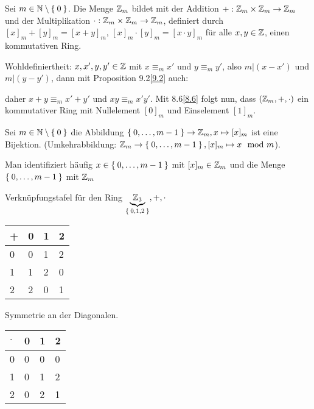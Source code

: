 \documentclass{../../meta/tudscript}
\begin{document}
            Sei $m \in \mathbb{N} \setminus \Set{0}$. Die Menge $\mathbb{Z}_m$ bildet mit der Addition $+: \mathbb{Z}_m \times \mathbb{Z}_m \rightarrow \mathbb{Z}_m$ und der Multiplikation 
            $\cdot: \mathbb{Z}_m \times \mathbb{Z}_m \rightarrow \mathbb{Z}_m$, definiert durch $[x]_m + [y]_m = [x+y]_m$, $[x]_m \cdot [y]_m = [x \cdot y]_m$ für alle $x,y \in \mathbb{Z}$, 
            einen kommutativen Ring.

                Wohldefiniertheit: $x, x', y, y' \in \mathbb{Z}$ mit $x \equiv_m x'$ und $y \equiv_m y'$, also $m|(x-x')$ und $m|(y-y')$, dann mit Proposition 9.2\ref{9.2} auch:
    
                
                daher $x+y \equiv_m  x'+y'$ und $xy \equiv_m x'y'$.
                Mit 8.6\ref{8.6} folgt nun, dass $(\mathbb{Z}_m, +, \cdot)$ ein kommutativer Ring mit Nullelement $[0]_m$ und Einselement $[1]_m$.

            Sei $m \in \mathbb{N} \setminus \Set{0}$ die Abbildung $\Set{0, \ldots, m-1} \rightarrow \mathbb{Z}_m, x \mapsto [x]_m$ ist eine Bijektion. 
            (Umkehrabbildung: $\mathbb{Z}_m \rightarrow \Set{0, \ldots, m-1}, [x]_m \mapsto x \mod m$).

            Man identifiziert häufig $x \in \Set{0, \ldots, m-1}$ mit $[x]_m \in \mathbb{Z}_m$ und die Menge $\Set{0, \ldots, m-1}$ mit $\mathbb{Z}_m$
            
            Verknüpfungstafel für den Ring $\underbrace{\mathbb{Z}_3}_{\Set{0, 1, 2}}, +, \cdot$

		

				
					\begin{tabular}{|l|l|l|l|}
						\hline
						+ & 0 & 1 & 2 \\ \hline
						0 & 0 & 1 & 2 \\
						1 & 1 & 2 & 0 \\ 
						2 & 2 & 0 & 1 \\
					\end{tabular}
			

            	Symmetrie an der Diagonalen.
			
					\begin{tabular}{|l|l|l|l|}
		        		       	\hline
					$\cdot$  & 0 & 1 & 2 \\ \hline
                				0 & 0 & 0 & 0 \\
	                	   		1 & 0 & 1 & 2 \\
       		        		  	2 & 0 & 2 & 1 \\
            				\end{tabular}
             
\end{document}
